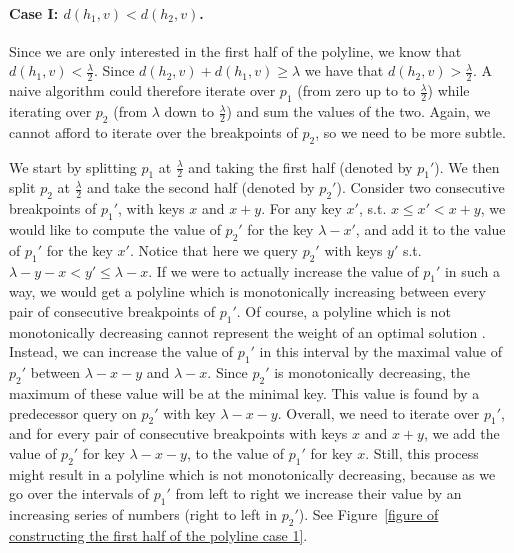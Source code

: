 \documentclass[11pt,a4paper]{article}
\theoremstyle{definition}
\theoremstyle{remark}
\begin{document}
\paragraph{Case I: \boldmath$d(h_1,v) < d(h_2,v)$.} Since we are only interested in the first half of the polyline, we know that $d(h_1,v) < \frac{\lambda}{2}$. Since $d(h_2,v) +d(h_1,v)\geq \lambda$ we have that  $d(h_2,v) > \frac{\lambda}{2}$. A naive algorithm could therefore iterate over $p_1$ (from zero up to to $\frac{\lambda}{2}$) while iterating over $p_2$ (from $\lambda$ down to $\frac{\lambda}{2}$) and sum the values of the two. Again, we cannot afford to iterate over the breakpoints of $p_2$, so we need to be more subtle.

We start by splitting $p_1$ at $\frac{\lambda}{2}$ and taking the first half (denoted by $p_1'$). We then split $p_2$ at $\frac{\lambda}{2}$ and take the second half (denoted by $p_2'$). Consider two consecutive breakpoints of $p_1'$, with keys $x$ and $x+y$. For any key $x'$, s.t. $x \leq x' < x+y$, we would like to compute the value of $p_2'$ for the key $\lambda-x'$, and add it to the value of $p_1'$ for the key $x'$. Notice that here we query $p_2'$ with keys $y'$ s.t. $\lambda -y -x < y' \leq \lambda-x$. If we were to actually increase the value of $p_1'$ in such a way, we would get a polyline which is monotonically increasing between every pair of consecutive breakpoints of $p_1'$. Of course, a polyline which is not monotonically decreasing  cannot represent the weight of an optimal solution%
. Instead, we can increase the value of $p_1'$ in this interval by the maximal value of $p_2'$ between $\lambda -x -y$ and $\lambda-x$. Since $p_2'$ is monotonically decreasing, the maximum of these value will be at the minimal key. This value is found by a predecessor query on $p_2'$ with key $\lambda-x-y$. Overall, we need to iterate over $p_1'$, and for every pair of consecutive breakpoints with keys $x$ and $x+y$, we add the value of $p_2'$ for key $\lambda-x-y$, to the value of $p_1'$ for key $x$.
Still, this process might result in a polyline which is not monotonically decreasing, because as we go over the intervals of $p_1'$ from left to right we increase their value by an increasing series of numbers (right to left in $p_2'$). See Figure~\ref{figure of constructing the first half of the polyline case 1}. %
\end{document}
